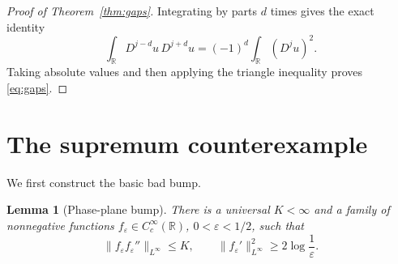 \documentclass[11pt]{article}
\newtheorem{lemma}[theorem]{Lemma}
\newcommand{\R}{\mathbb R}
\begin{document}
\begin{proof}[Proof of Theorem~\ref{thm:gaps}]
Integrating by parts $d$ times gives the exact identity
\[
 \int_\R D^{j-d}u\,D^{j+d}u
 =(-1)^d\int_\R (D^ju)^2.
\]
Taking absolute values and then applying the triangle inequality proves
\eqref{eq:gaps}.
\end{proof}

\section{The supremum counterexample}

We first construct the basic bad bump.

\begin{lemma}[Phase-plane bump]\label{lem:bump}
There is a universal $K<\infty$ and a family of nonnegative functions
$f_\varepsilon\in C_c^\infty(\R)$, $0<\varepsilon<1/2$, such that
\begin{equation}\label{eq:bump}
 \|f_\varepsilon f_\varepsilon''\|_{L^\infty}\le K,
 \qquad
 \|f_\varepsilon'\|_{L^\infty}^2
 \ge2\log\frac1\varepsilon.
\end{equation}
\end{lemma}
\end{document}
